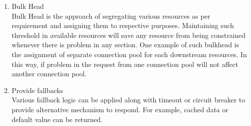 \begin{enumerate}
\begin{figure}[H]
\begin{center}
\label{fig:challanges_of_microservices_architecture/integration/inter_service_communication/states_of_circuit_breaker}
\end{center}
\end{figure}
\\
\item Bulk Head \\ Bulk Head is the approach of segregating various resources as per requirement and assigning them to respective purposes. Maintaining such threshold in available resources will save any resource from being constrained whenever there is problem in any section. One example of such bulkhead is the assignment of separate connection pool for each downstream resources. In this way, if problem in the request from one connection pool will not affect another connection pool. \cite{Newman:2015aa} \cite{Nygard:2007aa}
\item Provide fallbacks \\ Various fallback logic can be applied along with timeout or circuit breaker to provide alternative mechanism to respond. For example, cached data or default value can be returned. 
\end{enumerate}



















